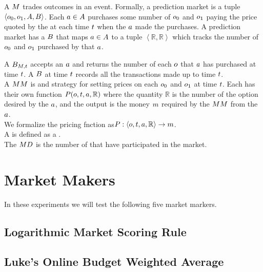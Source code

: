 A  $M$ trades outcomes in an event. Formally, a prediction market 
is a tuple $\left<o_0,o_1, A, B\right>$. Each  
$a\in A$ purchases some number of $o_0$ and $o_1$ paying the price 
quoted by the  at each time $t$ when the  $a$ 
made the purchases. A prediction market has a  $B$ that maps $a\in A$ to a tuple $\left<\mathbb{R},\mathbb{R}\right>$ which tracks the number of $o_0$ and $o_1$ 
purchased by that  $a$.

A  $B_{M,t}$ accepts an  $a$ and returns the number of 
each  $o$ that  $a$ has purchased at time $t$. A 
 $B$ at time $t$ records all the transactions made up to time $t$.\\

A  $MM$ is  and strategy for setting prices
on each  $o_0$ and $o_1$ at time $t$. Each  has
their own function $P(o,t,a,\mathbb{R})$ where the quantity $\mathbb{R}$ is the
number of the option desired by the  $a$, and the output is the money $m$
required by the  $MM$ from the  $a$. \\

We formalize the pricing fnction as$P:\left<o,t,a,\mathbb{R}\right> \rightarrow m$.\\

A  is defined as a .\\

The  $MD$ is the number of  that have participated in the market.\\

\section{Market Makers}
In these experiments we will test the following five market markers.
\subsection{Logarithmic Market Scoring Rule}
\subsection{Luke's Online Budget Weighted Average}
